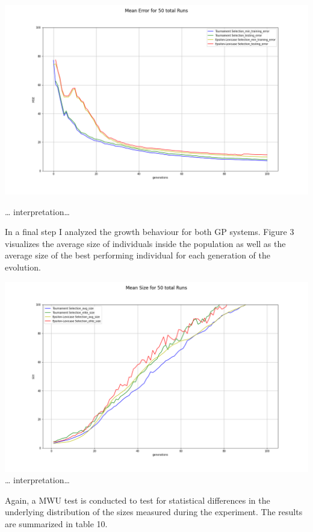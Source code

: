 \documentclass[
  12pt,
]{article}
\let\origfigure\figure
\let\endorigfigure\endfigure
\renewenvironment{figure}[1][2] {
    \expandafter\origfigure\expandafter[H]
} {
    \endorigfigure
}
\begin{document}
\begin{figure}
\centering
\includegraphics{./plots/mean_error_combined.png}
\caption{Mean Errors}
\end{figure}

\ldots{} interpretation\ldots{}

In a final step I analyzed the growth behaviour for both GP systems.
Figure 3 visualizes the average size of individuals inside the
population as well as the average size of the best performing individual
for each generation of the evolution.

\includegraphics{./plots/size_combined.png} \ldots{}
interpretation\ldots{}

Again, a MWU test is conducted to test for statistical differences in
the underlying distribution of the sizes measured during the experiment.
The results are summarized in table 10.
\end{document}
